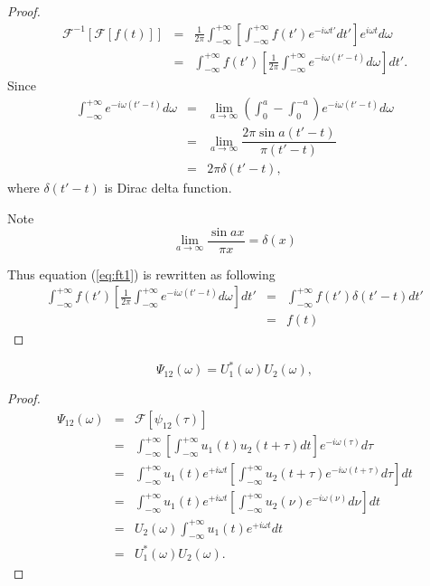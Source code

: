 \documentclass{proposal}
\begin{document}
\begin{proof}
\begin{eqnarray}
\mathcal{F}^{-1}[\mathcal{F}[f(t)]]  &=& \frac{1}{2\pi} \int_{-\infty}^{+\infty} \left[\int_{-\infty}^{+\infty}  f(t') e^{-i\omega t'} dt'\right] e^{i\omega t} d\omega \\
&=& \int_{-\infty}^{+\infty}  f(t') \left[ \frac{1}{2\pi} \int_{-\infty}^{+\infty} e^{-i\omega (t' - t)} d\omega \right] dt'.
  \label{eq:ft1}
\end{eqnarray}
Since
\begin{eqnarray}
 \int_{-\infty}^{+\infty}  e^{-i\omega (t' - t)} d\omega &=& \lim_{a \to \infty} \left(\int_0^{a} - \int_0^{-a} \right)  e^{-i\omega (t' - t)} d\omega \\
 &=& \lim_{a \to \infty}  \dfrac{2\pi \sin{a(t'-t)}}{\pi(t'-t)} \\
 &=& 2\pi \delta(t'-t),
\end{eqnarray}
where $\delta(t'-t)$ is Dirac delta function.
\begin{itembox}[l]{Note}
 \begin{equation}
  \lim_{a \to \infty} \dfrac{\sin{ax}}{\pi x} = \delta(x)
 \end{equation}
\end{itembox}
Thus equation (\ref{eq:ft1}) is rewritten as following
\begin{eqnarray}
\int_{-\infty}^{+\infty}  f(t') \left[ \frac{1}{2\pi} \int_{-\infty}^{+\infty} e^{-i\omega (t' - t)} d\omega \right] dt' &=& \int_{-\infty}^{+\infty}  f(t') \delta(t'-t) dt' \\
&=&f(t)
\end{eqnarray}
\end{proof}

\begin{lemma}
\begin{equation}
\Psi_{12}(\omega) = U_1^*(\omega)U_2(\omega),
\end{equation}
\end{lemma}

\begin{proof}
\begin{eqnarray}
\Psi_{12}(\omega) &=& \mathcal{F}[\psi_{12}(\tau)]  \\
&=& \int_{-\infty}^{+\infty} \left[\int_{-\infty}^{+\infty}  u_1(t) u_2(t+\tau) dt \right] e^{-i\omega (\tau)} d\tau \\
&=& \int_{-\infty}^{+\infty} u_1(t) e^{+i\omega t} \left[\int_{-\infty}^{+\infty} u_2(t+\tau) e^{-i\omega (t+\tau)} d\tau \right] dt\\
&=& \int_{-\infty}^{+\infty} u_1(t) e^{+i\omega t} \left[\int_{-\infty}^{+\infty} u_2(\nu) e^{-i\omega (\nu)} d\nu \right] dt \\
&=& U_2(\omega) \int_{-\infty}^{+\infty} u_1(t) e^{+i\omega t} dt\\
&=& U_1^*(\omega)U_2(\omega).
\end{eqnarray}
\end{proof}
\end{document}
